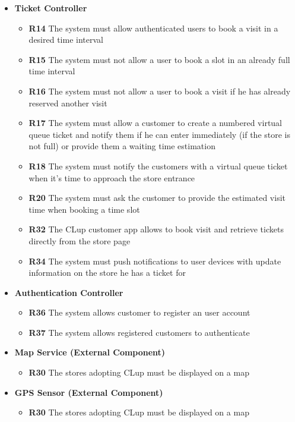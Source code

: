 \begin{itemize}
\begin{itemize}
          \end{itemize}
    \item \colorbox{clup_blue0}{\textbf{Ticket Controller}}
          \begin{itemize}
              \item \textbf{R14} The system must allow authenticated users to book a visit in a desired time interval
              \item \textbf{R15} The system must not allow a user to book a slot in an already full time interval
              \item \textbf{R16} The system must not allow a user to book a visit if he has already reserved another visit
              \item \textbf{R17} The system must allow a customer to create a numbered virtual queue ticket and notify them if he can enter immediately (if the store is not full) or provide them a waiting time estimation
              \item \textbf{R18} The system must notify the customers with a virtual queue ticket when it’s time to approach the store entrance
              \item \textbf{R20} The system must ask the customer to provide the estimated visit time when booking a time slot
              \item \textbf{R32} The CLup customer app allows to book visit and retrieve tickets directly from the store page
              \item \textbf{R34} The system must push notifications to user devices with update information on the store he has a ticket for
          \end{itemize}
    \item \colorbox{clup_blue0}{\textbf{Authentication Controller}}
          \begin{itemize}
              \item \textbf{R36} The system allows customer to register an user account
              \item \textbf{R37} The system allows registered customers to authenticate
          \end{itemize}
    \item \colorbox{clup_blue0}{\textbf{Map Service (External Component)}}
          \begin{itemize}
              \item \textbf{R30} The stores adopting CLup must be displayed on a map
          \end{itemize}
    \item \colorbox{clup_blue0}{\textbf{GPS Sensor (External Component)}}
          \begin{itemize}
              \item \textbf{R30} The stores adopting CLup must be displayed on a map
          \end{itemize}
\end{itemize}

